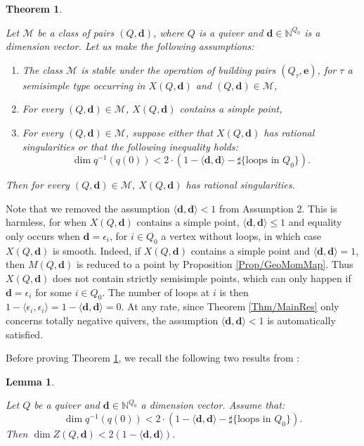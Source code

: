\documentclass[11pt,english]{article}
\numberwithin{equation}{section}
\numberwithin{figure}{section}
\theoremstyle{definition}
\theoremstyle{plain}
\newtheorem{thm}[df]{Theorem}
\newtheorem{lem}[df]{Lemma}
\theoremstyle{remark}
\newcommand\dd{\mathbf{d}}
\newcommand\ee{\mathbf{e}}
\begin{document}
\begin{thm} \label{Thm/ModifInduction}

Let $\mathcal{M}$ be a class of pairs $(Q,\dd)$, where $Q$ is a
quiver and $\dd\in\mathbb{N}^{Q_{0}}$ is a dimension vector. Let
us make the following assumptions:
\begin{enumerate}
\item The class $\mathcal{M}$ is stable under the operation of building
pairs $(Q_{\tau},\ee)$, for $\tau$ a semisimple type occurring in
$X(Q,\dd)$ and $(Q,\dd)\in\mathcal{M}$,
\item For every $(Q,\dd)\in\mathcal{M}$, $X(Q,\dd)$ contains a simple
point,
\item For every $(Q,\dd)\in\mathcal{M}$, suppose either that $X(Q,\dd)$
has rational singularities or that the following inequality holds:\[
\dim q^{-1}(q(0))<2\cdot(1-\langle\dd,\dd\rangle-\sharp\{\text{loops in } Q_0\}).
\]
\end{enumerate}
Then for every $(Q,\dd)\in\mathcal{M}$, $X(Q,\dd)$ has rational
singularities.

\end{thm}

Note that we removed the assumption $\langle\dd,\dd\rangle<1$ from
Assumption 2. This is harmless, for when $X(Q,\dd)$ contains a simple
point, $\langle\dd,\dd\rangle\leq1$ and equality only occurs when
$\dd=\epsilon_{i}$, for $i\in Q_{0}$ a vertex without loops, in
which case $X(Q,\dd)$ is smooth. Indeed, if $X(Q,\dd)$ contains
a simple point and $\langle\dd,\dd\rangle=1$, then $M(Q,\dd)$ is
reduced to a point by Proposition \ref{Prop/GeoMomMap}. Thus $X(Q,\dd)$
does not contain strictly semisimple points, which can only happen
if $\dd=\epsilon_{i}$ for some $i\in Q_{0}$. The number of loops
at $i$ is then $1-\langle\epsilon_{i},\epsilon_{i}\rangle=1-\langle\dd,\dd\rangle=0$.
At any rate, since Theorem \ref{Thm/MainRes} only concerns totally
negative quivers, the assumption $\langle\dd,\dd\rangle<1$ is automatically
satisfied.

Before proving Theorem \ref{Thm/ModifInduction}, we recall the following
two results from \cite{Bud21}:

\begin{lem}{\cite[Lem. 2.16.]{Bud21}} \label{Lem/BoundDimStratZ}

Let $Q$ be a quiver and $\dd\in\mathbb{N}^{Q_{0}}$ a dimension vector.
Assume that:\[
\dim q^{-1}(q(0))<2\cdot(1-\langle\dd,\dd\rangle-\sharp\{\text{loops in } Q_0\}).
\] Then $\dim Z(Q,\dd)<2(1-\langle\dd,\dd\rangle)$.

\end{lem}
\end{document}
